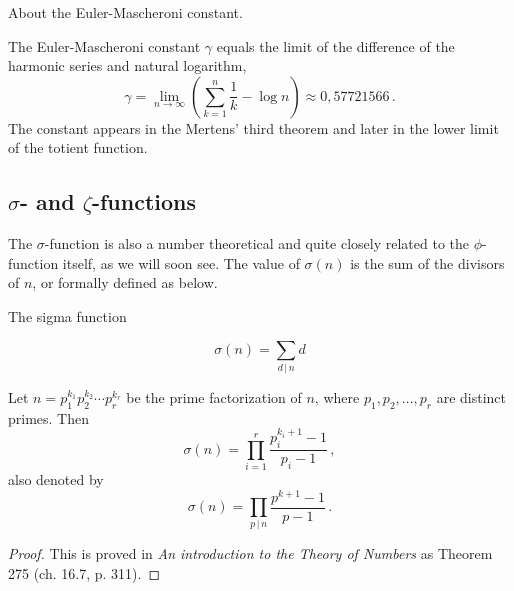 \documentclass{article}
\begin{document}
\begin{remark}
About the Euler-Mascheroni constant. \emph{\cite{gamma}}

The Euler-Mascheroni constant $\gamma$ equals the limit of the difference of the harmonic series and natural logarithm,
\begin{equation*}
    \gamma=\lim_{n\rightarrow\infty} \left(\sum_{k=1}^n \frac{1}{k} - \log n\right) \approx 0,57721566\,.
\end{equation*}
The constant appears in the Mertens' third theorem and later in the lower limit of the totient function.

\end{remark}

\subsection{$\sigma$- and $\zeta$-functions}

The $\sigma$-function is also a number theoretical and quite closely related to the $\phi$-function itself, as we will soon see. The value of $\sigma(n)$ is the sum of the divisors of $n$, or formally defined as below.

\begin{definition}
The sigma function

\begin{equation*}
    \sigma(n)=\sum_{d\,\vert\, n} d
\end{equation*}
\end{definition}

\begin{lemma}
\label{lemma:sigma}
Let $n=p_1^{k_1}p_2^{k_2}\cdots p_r^{k_r}$ be the prime factorization of $n$, where $p_1,p_2,\dots,p_r$ are distinct primes. Then
\begin{equation*}
    \sigma(n)=\prod_{i=1}^r \frac{p_i^{k_i+1}-1}{p_i-1}\,,
\end{equation*}
also denoted by
\begin{equation*}
    \sigma(n) = \prod_{p\,\vert\, n} \frac{p^{k+1}-1}{p-1}\,.
\end{equation*}

\begin{proof}
This is proved in \textit{An introduction to the Theory of Numbers} \cite{HardyWright} as Theorem 275 (ch. 16.7, p. 311).
\end{proof}
\end{lemma}
\end{document}
